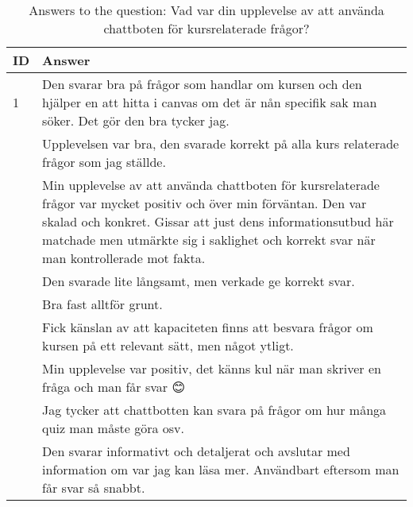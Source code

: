 \begin{table}[h]
\centering
{\small
\begin{tabularx}{\textwidth}{@{}lX@{}}
\toprule
\textbf{ID} & \textbf{Answer} \\ \midrule
1 & Den svarar bra på frågor som handlar om kursen och den hjälper en att hitta i canvas om det är nån specifik sak man söker. Det gör den bra tycker jag. \\ \hdashline
2 & Upplevelsen var bra, den svarade korrekt på alla kurs relaterade frågor som jag ställde. \\ \hdashline
3 & Min upplevelse av att använda chattboten för kursrelaterade frågor var mycket positiv och över min förväntan. Den var skalad och konkret. Gissar att just dens informationsutbud här matchade men utmärkte sig i saklighet och korrekt svar när man kontrollerade mot fakta. \\ \hdashline
4 & Den svarade lite långsamt, men verkade ge korrekt svar. \\ \hdashline
5 & Bra fast alltför grunt. \\ \hdashline
6 & Fick känslan av att kapaciteten finns att besvara frågor om kursen på ett relevant sätt, men något ytligt. \\ \hdashline
7 & Min upplevelse var positiv, det känns kul när man skriver en fråga och man får svar 😊 \\ \hdashline
8 & Jag tycker att chattbotten kan svara på frågor om hur många quiz man måste göra osv. \\ \hdashline
9 & Den svarar informativt och detaljerat och avslutar med information om var jag kan läsa mer. Användbart eftersom man får svar så snabbt. \\
\bottomrule
\end{tabularx}
}
\vspace{2mm}
\caption{Answers to the question: Vad var din upplevelse av att använda chattboten för kursrelaterade frågor?}
\label{tab:appendix_typeform_table_question_experience}
\end{table}


